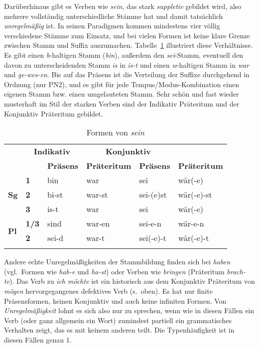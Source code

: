 Darüberhinaus gibt es Verben wie \textit{sein}, das stark \textit{suppletiv} gebildet wird, also mehrere vollständig unterschiedliche Stämme hat und damit tatsächlich \textit{unregelmäßig} ist.\label{abs:kleineverbklassen123}
In seinen Paradigmen kommen mindestens vier völlig verschiedene Stämme zum Einsatz, und bei vielen Formen ist keine klare Grenze zwischen Stamm und Suffix auszumachen.
Tabelle~\ref{tab:kleineverbklassen124} illustriert diese Verhältnisse.
Es gibt einen \textit{b}-haltigen Stamm (\textit{bin}), außerdem den \textit{sei}-Stamm, eventuell den davon zu unterscheidenden Stamm \textit{is} in \textit{is-t} und einen \textit{w}-haltigen Stamm in \textit{war} und \textit{ge-wes-en}.
Bis auf das Präsens ist die Verteilung der Suffixe durchgehend in Ordnung (nur PN2), und es gibt für jede Tempus\slash Modus-Kombination einen eigenen Stamm bzw. einen umgelauteten Stamm.
Sehr schön und fast wieder musterhaft im Stil der starken Verben sind der Indikativ Präteritum und der Konjunktiv Präteritum gebildet.

\begin{table}[!htbp]
  \centering
  \begin{tabular}{llllll}
    \lsptoprule
    \multicolumn{2}{c}{} & \multicolumn{2}{c}{\textbf{Indikativ}} & \multicolumn{2}{c}{\textbf{Konjunktiv}} \\
    \multicolumn{2}{c}{} & \textbf{Präsens} & \textbf{Präteritum} & \textbf{Präsens} & \textbf{Präteritum} \\
    \midrule
    \multirow{3}{*}{\textbf{Sg}} & \textbf{1} & bin & war & sei & wär(-e) \\
    & \textbf{2} & bi-st & war-st & sei-(e)st & wär(-e)-st \\
    & \textbf{3} & is-t & war & sei & wär(-e) \\
    \midrule
    \multirow{2}{*}{\textbf{Pl}} & \textbf{1/3} & sind & war-en & sei-e-n & wär-e-n \\
     & \textbf{2} & sei-d & war-t & sei(-e)-t & wär(-e)-t \\
    \lspbottomrule
  \end{tabular}
  \caption{Formen von \textit{sein}}
  \label{tab:kleineverbklassen124}
\end{table}

Andere echte Unregelmäßigkeiten der Stammbildung finden sich bei \textit{haben} (vgl.\ Formen wie \textit{hab-e} und \textit{ha-st}) oder Verben wie \textit{bringen} (Präteritum \textit{brach-te}).
\label{abs:kleineverbklassen125}Das Verb zu \textit{ich möchte} ist ein historisch aus dem Konjunktiv Präteritum von \textit{mögen} hervorgegangenes defektives Verb (s.\ oben).
Es hat nur finite Präsensformen, keinen Konjunktiv und auch keine infiniten Formen.
Von \textit{Unregelmäßigkeit} lohnt es sich also nur zu sprechen, wenn wie in diesen Fällen ein Verb (oder ganz allgemein ein Wort) zumindest partiell ein grammatisches Verhalten zeigt, das es mit keinem anderen teilt.
Die Typenhäufigkeit ist in diesen Fällen genau 1.

